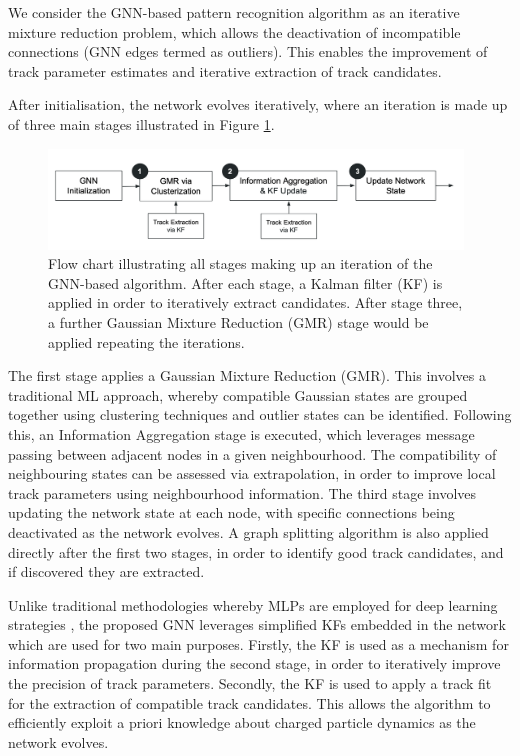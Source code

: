 We consider the GNN-based pattern recognition algorithm as an iterative mixture reduction problem, which allows the deactivation of incompatible connections (GNN edges termed as outliers). This enables the improvement of track parameter estimates and iterative extraction of track candidates. 

After initialisation, the network evolves iteratively, where an iteration is made up of three main stages illustrated in Figure \ref{fig:flowchart}. 

\begin{figure}[htbp]
    \centering
    \includegraphics[width=0.98\textwidth]{images/5-gnn-algorithm/gnn-workflow.png}
    \caption{Flow chart illustrating all stages making up an iteration of the GNN-based algorithm. After each stage, a Kalman filter (KF) is applied in order to iteratively extract candidates. After stage three, a further Gaussian Mixture Reduction (GMR) stage would be applied repeating the iterations.}
    \label{fig:flowchart}%
\end{figure}


The first stage applies a Gaussian Mixture Reduction (GMR). This involves a traditional ML approach, whereby compatible Gaussian states are grouped together using clustering techniques and outlier states can be identified. Following this, an Information Aggregation stage is executed, which leverages message passing between adjacent nodes in a given neighbourhood. The compatibility of neighbouring states can be assessed via extrapolation, in order to improve local track parameters using neighbourhood information. The third stage involves updating the network state at each node, with specific connections being deactivated as the network evolves. A graph splitting algorithm is also applied directly after the first two stages, in order to identify good track candidates, and if discovered they are extracted. 

Unlike traditional methodologies whereby MLPs are employed for deep learning strategies \cite{Caillou:2815578}, the proposed GNN leverages simplified KFs embedded in the network which are used for two main purposes. Firstly, the KF is used as a mechanism for information propagation during the second stage, in order to iteratively improve the precision of track parameters. Secondly, the KF is used to apply a track fit for the extraction of compatible track candidates. This allows the algorithm to efficiently exploit a priori knowledge about charged particle dynamics as the network evolves.

